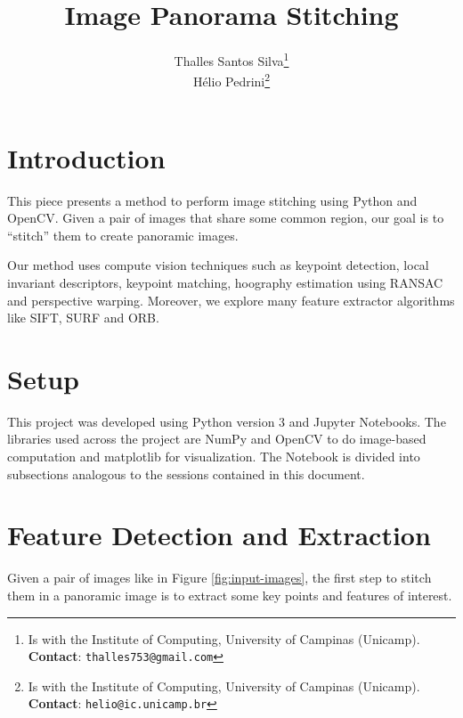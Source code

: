 \documentclass[10pt,twocolumn,letterpaper]{article}
\begin{document}
\title{Image Panorama Stitching}
\author{Thalles Santos Silva\thanks{Is with the Institute of Computing, University of Campinas (Unicamp). \textbf{Contact}: \tt\small{thalles753@gmail.com}}\\
Hélio Pedrini\thanks{Is with the Institute of Computing, University of Campinas (Unicamp). \textbf{Contact}: \tt\small{helio@ic.unicamp.br}}
}

\maketitle
\section{Introduction}

This piece presents a method to perform image stitching using Python and OpenCV. Given a pair of images that share some common region, our goal is to “stitch” them to create panoramic images. 

Our method uses compute vision techniques such as keypoint detection, local invariant descriptors, keypoint matching, hoography estimation using RANSAC and perspective warping. Moreover, we explore many feature extractor algorithms like SIFT, SURF and ORB.

\section{Setup}

This project was developed using Python version 3 and Jupyter Notebooks. The libraries used across the project are NumPy \cite{NumPy} and OpenCV \cite{OpenCV} to do image-based computation and matplotlib \cite{Matplotlib} for visualization. The Notebook is divided into subsections analogous to the sessions contained in this document.

\section{Feature Detection and Extraction}

Given a pair of images like in Figure \ref{fig:input-images}, the first step to stitch them in a panoramic image is to extract some key points and features of interest.
\end{document}

